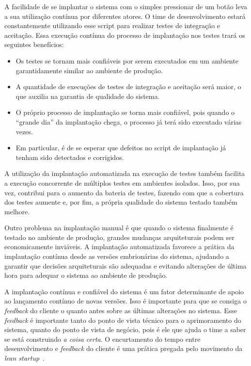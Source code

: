A facilidade de se implantar o sistema com o simples pressionar de um botão
leva a sua utilização contínua por diferentes atores.
O time de desenvolvimento estará constantemente utilizando esse script 
para realizar testes de integração e aceitação. 
Essa execução contínua do processo de implantação nos testes trará os seguintes benefícios:

\begin{itemize}
\item Os testes se tornam mais confiáveis por serem executados em um ambiente garantidamente similar ao ambiente de produção.
\item A quantidade de execuções de testes de integração e aceitação será maior, o que auxilia na garantia de qualidade do sistema.
\item O próprio processo de implantação se torna mais confiável, pois quando o ``grande dia'' da implantação chega, o processo já terá sido executado várias vezes.
\item Em particular, é de se esperar que defeitos no script de implantação já tenham sido detectados e corrigidos.
\end{itemize}

A utilização da implantação automatizada na execução de testes também
facilita a execução concorrente de múltiplos testes em ambientes isolados.
Isso, por sua vez, contribui para o aumento da bateria de testes, fazendo com que
a cobertura dos testes aumente e, por fim, a própria qualidade do sistema testado também melhore.

Outro problema na implantação manual é que quando o sistema finalmente é testado
no ambiente de produção, grandes mudanças arquiteturais podem ser economicamente inviáveis.
A implantação automatizada favorece a prática da implantação contínua desde as versões
embrionárias do sistema, ajudando a garantir que decisões arquiteturais são adequadas
e evitando alterações de última hora para adequar o sistema ao ambiente de produção.

A implantação contínua e confiável do sistema é um fator determinante de apoio ao lançamento
contínuo de novas versões. Isso é importante para que se consiga o \emph{feedback} do cliente
o quanto antes sobre as últimas alterações no sistema.
Esse \emph{feedback} é importante tanto do ponto de vista técnico para o aprimoramento do sistema,
quanto do ponto de vista de negócio, pois é ele que ajuda o time a saber se está construindo
\emph{a coisa certa}.
O encurtamento do tempo entre desenvolvimento e \emph{feedback} do cliente
é uma prática pregada pelo movimento da \emph{lean startup}~\cite{Ries2011Lean}.

